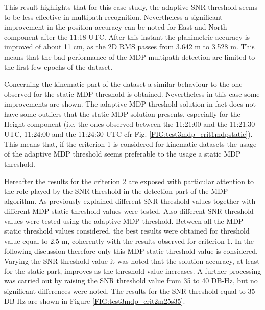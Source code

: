 This result highlights that for this case study, the adaptive SNR threshold seems to be less effective in multipath recognition. Nevertheless a significant improvement in the position accuracy can be noted for East and North component after the 11:18 UTC. After this instant the planimetric accuracy is improved of about 11 cm, as the 2D RMS passes from 3.642 m to 3.528 m. This means that the bad performance of the MDP multipath detection are limited to the first few epochs of the dataset. 

Concerning the kinematic part of the dataset a similar behaviour to the one observed for the static MDP threshold is obtained. Nevertheless in this case some improvements are shown. The adaptive MDP threshold solution in fact does not have some outliers that the static MDP solution presents, especially for the Height component (i.e. the ones observed between the 11:21:00 and the 11:21:30 UTC, 11:24:00 and the 11:24:30 UTC cfr Fig. \ref{FIG:test3mdp_crit1mdpstatic}). This means that, if the criterion 1 is considered for kinematic datasets the usage of the adaptive MDP threshold seems preferable to the usage a static MDP threshold.

Hereafter the results for the criterion 2 are exposed with particular attention to the role played by the SNR threshold in the detection part of the MDP algorithm. As previously explained different SNR threshold values together with different MDP static threshold values were tested. Also different SNR threshold values were tested using the adaptive MDP threshold. 
Between all the MDP static threshold values considered, the best results were obtained for threshold value equal to 2.5 m, coherently with the results observed for criterion 1. In the following discussion therefore only this MDP static threshold value is considered. Varying the SNR threshold value it was noted that the solution accuracy, at least for the static part, improves as the threshold value increases. A further processing was carried out by raising the SNR threshold value from 35 to 40 DB-Hz, but no significant differences were noted. The results for the SNR threshold equal to 35 DB-Hz are shown in Figure \ref{FIG:test3mdp_crit2m25s35}.

